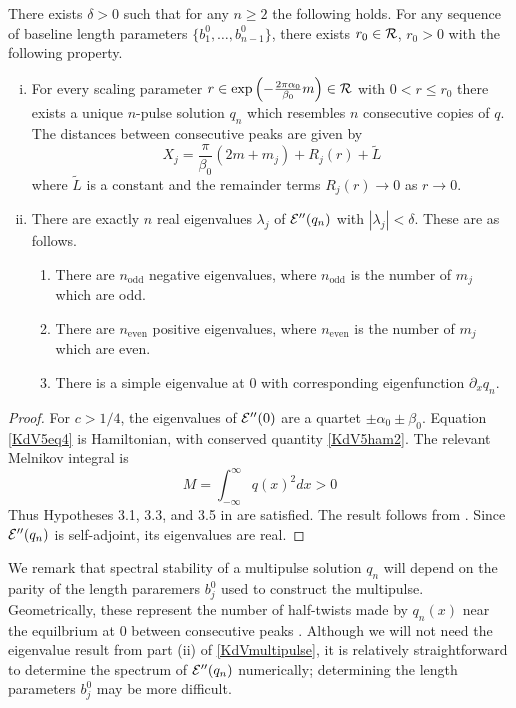 \documentclass[thesis.tex]{subfiles}
\begin{document}
\begin{theorem}\label{KdVmultipulse}
There exists $\delta > 0$ such that for any $n \geq 2$ the following holds. For any sequence of baseline length parameters $\{ b_1^0, \dots, b_{n-1}^0 \}$, there exists $r_0 \in \mathcal{R}$, $r_0 > 0$ with the following property.
\begin{enumerate}[(i)]
\item For every scaling parameter $r \in \mathop\mathrm{exp}\nolimits\left(-\frac{2 \pi \alpha_0}{\beta_0}m \right) \in \mathcal{R}$ with $0 < r \leq r_0$ there exists a unique $n$-pulse solution $q_n$ which resembles $n$ consecutive copies of $q$. The distances between consecutive peaks are given by
\[
X_j = \frac{\pi}{\beta_0}(2 m + m_j) + R_j(r) + \tilde{L}
\]
where $\tilde{L}$ is a constant and the remainder terms $R_j(r) \rightarrow 0$ as $r \rightarrow 0$.
\item There are exactly $n$ real eigenvalues $\lambda_j$ of $\mathcal{E}''(q_n)$ with $|\lambda_j| < \delta$. These are as follows.
\begin{enumerate}
	\item There are $n_{\text{odd}}$ negative eigenvalues, where $n_{\text{odd}}$ is the number of $m_j$ which are odd.
	\item There are $n_{\text{even}}$ positive eigenvalues, where $n_{\text{even}}$ is the number of $m_j$ which are even.
	\item There is a simple eigenvalue at 0 with corresponding eigenfunction $\partial_x q_n$.
\end{enumerate}
\end{enumerate}
\begin{proof}
For $c > 1/4$, the eigenvalues of $\mathcal{E}''(0)$ are a quartet $\pm \alpha_0 \pm \beta_0$. Equation \cref{KdV5eq4} is Hamiltonian, with conserved quantity \cref{KdV5ham2}. The relevant Melnikov integral is
\[
M = \int_{-\infty}^\infty q(x)^2 dx > 0
\]
Thus Hypotheses 3.1, 3.3, and 3.5 in \cite{SandstedeStrut} are satisfied. The result follows from \cite[Theorem 3.6]{SandstedeStrut}. Since $\mathcal{E}''(q_n)$ is self-adjoint, its eigenvalues are real.
\end{proof}
\end{theorem}

We remark that spectral stability of a multipulse solution $q_n$ will depend on the parity of the length pararemers $b_j^0$ used to construct the multipulse. Geometrically, these represent the number of half-twists made by $q_n(x)$ near the equilbrium at 0 between consecutive peaks \cite{SandstedeStrut}. Although we will not need the eigenvalue result from part (ii) of \cref{KdVmultipulse}, it is relatively straightforward to determine the spectrum of $\mathcal{E}''(q_n)$ numerically; determining the length parameters $b_j^0$ may be more difficult.
\end{document}
